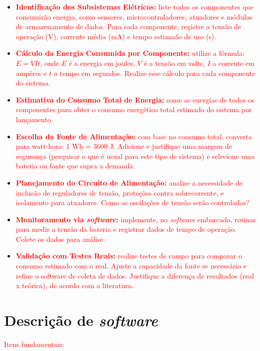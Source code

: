 \begin{itemize}
    \item \textcolor{red}{ \textbf{Identificação dos Subsistemas Elétricos:} liste todos os componentes que consumirão energia, como sensores, microcontroladores, atuadores e módulos de armazenamento de dados. Para cada componente, registre a tensão de operação (V), corrente média (mA) e tempo estimado de uso (s).}
    \item \textcolor{red}{ \textbf{Cálculo da Energia Consumida por Componente:} utilize a fórmula: $E = V I t$, onde $E$ é a energia em joules, $V$ é a tensão em volts, $I$ a corrente em ampères e $t$ o tempo em segundos. Realize esse cálculo para cada componente do sistema.}
    \item \textcolor{red}{ \textbf{Estimativa do Consumo Total de Energia:} some as energias de todos os componentes para obter o consumo energético total estimado do sistema por lançamento.}
    \item \textcolor{red}{ \textbf{Escolha da Fonte de Alimentação:} com base no consumo total, converta para watt-hora: 1 Wh = 3600 J. Adicione e justifique uma margem de segurança (pesquisar o que é usual para este tipo de sistema) e selecione uma bateria ou fonte que supra a demanda.}
    \item \textcolor{red}{ \textbf{Planejamento do Circuito de Alimentação:} analise a necessidade de inclusão de reguladores de tensão, proteções contra sobrecorrente, e isolamento para atuadores. Como as oscilações de tensão serão controladas?}
    \item \textcolor{red}{ \textbf{Monitoramento via \textit{software}:} implemente, no \textit{software} embarcado, rotinas para medir a tensão da bateria e registrar dados de tempo de operação. Colete os dados para análise.}
    \item \textcolor{red}{ \textbf{Validação com Testes Reais:} realize testes de campo para comparar o consumo estimado com o real. Ajuste a capacidade da fonte se necessário e refine o software de coleta de dados. Justifique a diferença de resultados (real x teórica), de acordo com a literatura.}
\end{itemize}

\section{Descrição de \textit{software}}

\textcolor{red}{Itens fundamentais:}

